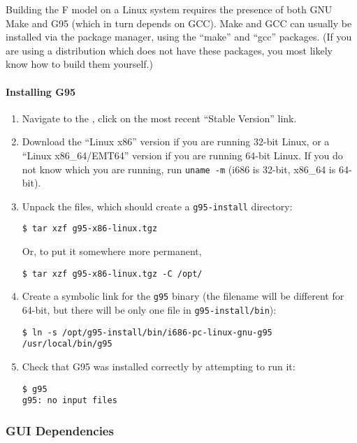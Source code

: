 Building the F model on a Linux system requires the presence of both GNU Make and G95 (which in turn 
depends on GCC).  Make and GCC can usually be installed via the package manager, using the ``make'' 
and ``gcc'' packages.  (If you are using a distribution which does not have these packages, you most 
likely know how to build them yourself.)

\paragraph{Installing G95}

\begin{enumerate}

\item Navigate to the , click on the 
most recent ``Stable Version'' link.

\item Download the ``Linux x86'' version if you are running 32-bit Linux, or a ``Linux 
x86\_64/EMT64'' version if you are running 64-bit Linux.  If you do not know which you are running, 
run \verb|uname -m| (i686 is 32-bit, x86\_64 is 64-bit).

\item Unpack the files, which should create a \verb|g95-install| directory:
\begin{lstlisting}
$ tar xzf g95-x86-linux.tgz
\end{lstlisting}
Or, to put it somewhere more permanent,
\begin{lstlisting}
$ tar xzf g95-x86-linux.tgz -C /opt/
\end{lstlisting}

\item Create a symbolic link for the \verb|g95| binary (the filename will be different for 64-bit, 
but there will be only one file in \verb|g95-install/bin|):
\begin{lstlisting}
$ ln -s /opt/g95-install/bin/i686-pc-linux-gnu-g95 /usr/local/bin/g95
\end{lstlisting}

\item Check that G95 was installed correctly by attempting to run it:
\begin{lstlisting}
$ g95
g95: no input files
\end{lstlisting}

\end{enumerate}


\subsubsection{GUI Dependencies}

